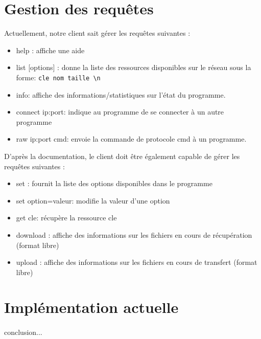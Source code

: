 	\section{Gestion des requ\^etes}

Actuellement, notre client sait gérer les requêtes suivantes :
\begin{itemize}
\item help : affiche une aide
\item list [options] : donne la liste des ressources disponibles sur le réseau 
      sous la forme: \verb"cle nom taille \n"
\item info: affiche des informations/statistiques sur l'état du programme.
\item connect ip:port: indique au programme de se connecter à un autre 
      programme
\item raw ip:port cmd: envoie la commande de protocole cmd à un programme. 
\end{itemize}

D'après la documentation, le client doit être également capable de gérer les 
requêtes suivantes :
\begin{itemize}
\item set : fournit la liste des options disponibles dans le programme
\item set option=valeur: modifie la valeur d'une option
\item get cle: récupère la ressource cle
\item download : affiche des informations sur les fichiers en cours de 
      récupération (format libre)
\item upload : affiche des informations sur les fichiers en cours de transfert
      (format libre)
\end{itemize}
	
	\section{Implémentation actuelle}
	
	\paragraph{}conclusion...
